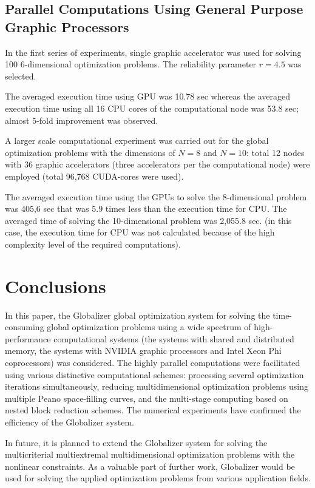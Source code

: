 \documentclass{aims}
\theoremstyle{definition}
\begin{document}
\subsection{Parallel Computations Using General Purpose Graphic Processors}
In the first series of experiments, single graphic accelerator was used for solving 100
6-dimensional optimization problems. The reliability parameter \(r=4.5\) was selected.
\par
The averaged execution time using GPU was 10.78 sec whereas the averaged execution
time using all 16 CPU cores of the computational node was 53.8 sec; almost 5-fold improvement was observed.
\par
A larger scale computational experiment was carried out for the global optimization
problems with the dimensions of \(N = 8\) and \(N = 10\): total 12 nodes with 36 graphic
accelerators (three accelerators per the computational node) were employed (total 96,768 CUDA-cores were used).
\par
The averaged execution time using the GPUs to solve the 8-dimensional problem was
405,6 sec that was 5.9 times less than the execution time for CPU. The averaged time
of solving the 10-dimensional problem was 2,055.8 sec. (in this case, the execution time for CPU
was not calculated because of the high complexity level of the required computations).

\section{Conclusions} \label{sec:concl}

In this paper, the Globalizer global optimization system for solving the time-consuming global optimization problems using a wide spectrum of high-performance computational systems (the systems with shared and distributed memory, the systems with NVIDIA graphic processors and Intel Xeon Phi coprocessors) was considered. The highly parallel computations were facilitated using various distinctive computational schemes: processing several optimization iterations simultaneously, reducing multidimensional optimization problems using multiple Peano space-filling curves, and the multi-stage computing based on nested block reduction schemes. The numerical experiments have confirmed the efficiency of the Globalizer system.

In future, it is planned to extend the Globalizer system for solving the multicriterial multiextremal multidimensional optimization problems with the nonlinear constraints. As a valuable part of further work, Globalizer would be used for solving the applied optimization problems from various application fields.
%
%
\end{document}
